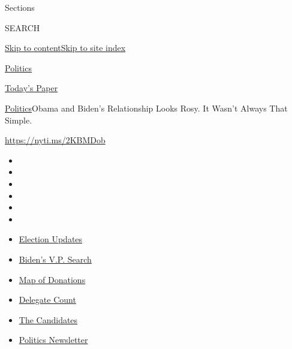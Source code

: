 Sections

SEARCH

\protect\hyperlink{site-content}{Skip to
content}\protect\hyperlink{site-index}{Skip to site index}

\href{https://www.nytimes.com/section/politics}{Politics}

\href{https://myaccount.nytimes.com/auth/login?response_type=cookie\&client_id=vi}{}

\href{https://www.nytimes.com/section/todayspaper}{Today's Paper}

\href{/section/politics}{Politics}\textbar{}Obama and Biden's
Relationship Looks Rosy. It Wasn't Always That Simple.

\url{https://nyti.ms/2KBMDob}

\begin{itemize}
\item
\item
\item
\item
\item
\item
\end{itemize}

\begin{itemize}
\item
  \href{https://www.nytimes.com/2020/07/31/us/elections/biden-vs-trump.html?action=click\&pgtype=Article\&state=default\&region=TOP_BANNER\&context=storylines_menu}{Election
  Updates}
\item
  \href{https://www.nytimes.com/article/biden-vice-president-2020.html?action=click\&pgtype=Article\&state=default\&region=TOP_BANNER\&context=storylines_menu}{Biden's
  V.P. Search}
\item
  \href{https://www.nytimes.com/interactive/2020/07/24/us/politics/trump-biden-campaign-donors.html?action=click\&pgtype=Article\&state=default\&region=TOP_BANNER\&context=storylines_menu}{Map
  of Donations}
\item
  \href{https://www.nytimes.com/interactive/2020/us/elections/delegate-count-primary-results.html?action=click\&pgtype=Article\&state=default\&region=TOP_BANNER\&context=storylines_menu}{Delegate
  Count}
\item
  \href{https://www.nytimes.com/interactive/2019/us/politics/2020-presidential-candidates.html?action=click\&pgtype=Article\&state=default\&region=TOP_BANNER\&context=storylines_menu}{The
  Candidates}
\item
  \href{https://www.nytimes.com/newsletters/politics?action=click\&pgtype=Article\&state=default\&region=TOP_BANNER\&context=storylines_menu}{Politics
  Newsletter}
\end{itemize}

